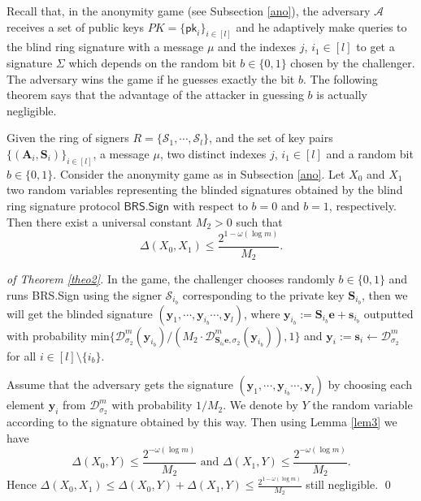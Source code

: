 \documentclass[runningheads]{llncs}
\begin{document}
Recall that, in the anonymity game (see Subsection \ref{ano}), the adversary $\mathcal{A}$ receives a set of public keys $PK=\{\mathsf{pk}_i\}_{i\in [l]}$ and he adaptively make queries to the blind ring signature with a message $\mu$ and the indexes $j$, $i_1 \in [l]$ to get a signature $\Sigma$ which depends on the random bit $b \in \{0,1\}$ chosen by the challenger. The adversary wins the game if he guesses exactly the bit $b$. 
The following theorem says that the advantage of the attacker in guessing $b$ is actually negligible.


\begin{theorem} \label{theo2}
	Given the ring of signers $R=\{\mathcal{S}_1, \cdots, \mathcal{S}_l\}$, and the set of key pairs $\{(\mathbf{A}_i, \mathbf{S}_i)\}_{i\in [l]}$, a message $\mu$, two distinct indexes $j$, $i_1 \in [l]$ and a random bit $b \in \{0,1\}$. Consider the anonymity game as in Subsection \ref{ano}. Let $X_0$ and $X_1$ two random variables representing the blinded signatures obtained by the blind ring signature protocol $\mathsf{BRS.Sign}$ with respect to $b=0$ and $b=1$, respectively. Then there exist a universal constant $M_2>0$ such that
	$$\Delta(X_0,X_1)\leq \frac{2^{1-\omega(\log m)}}{M_2}.$$
\end{theorem}
\begin{proof}[of Theorem \ref{theo2}]
	In the game, the challenger chooses randomly $b \in \{0,1\}$ and runs \textsf{BRS.Sign} using the signer $\mathcal{S}_{i_b}$ corresponding to the private key $\mathbf{S}_{i_b}$, then we will get the blinded signature $(\mathbf{y}_1, \cdots, \mathbf{y}_{i_b} \cdots, \mathbf{y}_l )$, where $\mathbf{y}_{i_b}:=\mathbf{S}_{i_b}\mathbf{e}+\mathbf{s}_{i_b}$ outputted with probability min$\{ {\mathcal{D}_{\sigma_2}^m(\mathbf{y}_{i_b})}/({M_2 \cdot \mathcal{D}^m_{\mathbf{S}_{i_b}\mathbf{e},\sigma_2}(\mathbf{y}_{i_b})}),1\}$ and $\mathbf{y}_i:=\mathbf{s}_i \leftarrow \mathcal{D}_{\sigma_2}^m$ for all $i \in [l] \setminus\{i_b\}$.
	
	Assume that the adversary gets the signature $(\mathbf{y}_1, \cdots, \mathbf{y}_{i_b} \cdots, \mathbf{y}_l )$ by choosing each element $\mathbf{y}_i$ from $\mathcal{D}_{\sigma_2}^m$ with probability $1/M_2$. We denote by $Y$ the random variable according to the signature obtained by this way.  Then using Lemma \ref{lem3} we have
	$$ \Delta(X_0,Y) \leq \frac{2^{-\omega(\log m)}}{M_2}  \text{ and }  \Delta(X_1,Y) \leq \frac{2^{-\omega(\log m)}}{M_2}. $$
	Hence $\Delta(X_0,X_1)\leq  \Delta(X_0,Y)+  \Delta(X_1,Y) \leq \frac{2^{1-\omega(\log m)}}{M_2} $ still negligible. \qed
\end{proof}
\end{document}
